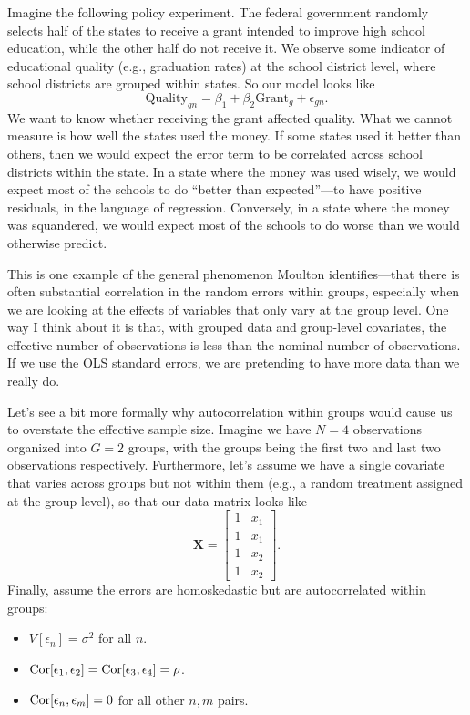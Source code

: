 \documentclass[12pt,oneside,openany]{book}
\providecommand{\tightlist}{%
  \setlength{\itemsep}{0pt}\setlength{\parskip}{0pt}}
\begin{document}
Imagine the following policy experiment. The federal government randomly
selects half of the states to receive a grant intended to improve high
school education, while the other half do not receive it. We observe
some indicator of educational quality (e.g., graduation rates) at the
school district level, where school districts are grouped within states.
So our model looks like \[
\text{Quality}_{gn} = \beta_1 + \beta_2 \text{Grant}_g + \epsilon_{gn}.
\] We want to know whether receiving the grant affected quality. What we
cannot measure is how well the states used the money. If some states
used it better than others, then we would expect the error term to be
correlated across school districts within the state. In a state where
the money was used wisely, we would expect most of the schools to do
``better than expected''---to have positive residuals, in the language
of regression. Conversely, in a state where the money was squandered, we
would expect most of the schools to do worse than we would otherwise
predict.

This is one example of the general phenomenon Moulton
\citetext{\citeyear{Moulton:1986kw}; \citeyear{Moulton:1990bl}}
identifies---that there is often substantial correlation in the random
errors within groups, especially when we are looking at the effects of
variables that only vary at the group level. One way I think about it is
that, with grouped data and group-level covariates, the effective number
of observations is less than the nominal number of observations. If we
use the OLS standard errors, we are pretending to have more data than we
really do.

Let's see a bit more formally why autocorrelation within groups would
cause us to overstate the effective sample size. Imagine we have
\(N = 4\) observations organized into \(G = 2\) groups, with the groups
being the first two and last two observations respectively. Furthermore,
let's assume we have a single covariate that varies across groups but
not within them (e.g., a random treatment assigned at the group level),
so that our data matrix looks like \[
\mathbf{X} = \begin{bmatrix}
1 & x_1 \\
1 & x_1 \\
1 & x_2 \\
1 & x_2
\end{bmatrix}.
\] Finally, assume the errors are homoskedastic but are autocorrelated
within groups:

\begin{itemize}
\tightlist
\item
  \(V[\epsilon_n] = \sigma^2\) for all \(n\).
\item
  \(\mathop{\rm Cor}\nolimits[\epsilon_1, \epsilon_2] = \mathop{\rm Cor}\nolimits[\epsilon_3, \epsilon_4] = \rho\).
\item
  \(\mathop{\rm Cor}\nolimits[\epsilon_n, \epsilon_m] = 0\) for all other \(n, m\) pairs.
\end{itemize}
\end{document}
